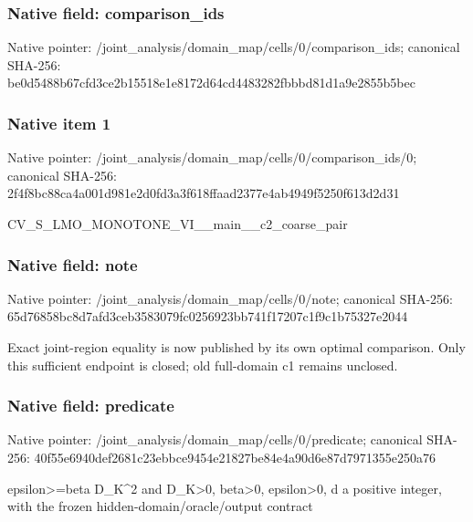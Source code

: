 \documentclass[10pt,a4paper]{article}
\begin{document}
\subsubsection{Native field: comparison\_\allowbreak{}ids}
Native pointer: /joint\_\allowbreak{}analysis/domain\_\allowbreak{}map/cells/0/comparison\_\allowbreak{}ids; canonical SHA-256: be0d5488b67cfd3ce2b15518e1e8172d64cd4483282fbbbd81d1a9e2855b5bec

\subsubsection{Native item 1}
Native pointer: /joint\_\allowbreak{}analysis/domain\_\allowbreak{}map/cells/0/comparison\_\allowbreak{}ids/0; canonical SHA-256: 2f4f8bc88ca4a001d981e2d0fd3a3f618ffaad2377e4ab4949f5250f613d2d31

\begingroup\raggedright\sloppy CV\_\allowbreak{}S\_\allowbreak{}LMO\_\allowbreak{}MONOTONE\_\allowbreak{}VI\_\allowbreak{}\_\allowbreak{}main\_\allowbreak{}\_\allowbreak{}c2\_\allowbreak{}coarse\_\allowbreak{}pair\par\endgroup

\subsubsection{Native field: note}
Native pointer: /joint\_\allowbreak{}analysis/domain\_\allowbreak{}map/cells/0/note; canonical SHA-256: 65d76858bc8d7afd3ceb3583079fc0256923bb741f17207c1f9c1b75327e2044

\begingroup\raggedright\sloppy Exact joint-region equality is now published by its own optimal comparison. Only this sufficient endpoint is closed;\allowbreak{} old full-domain c1 remains unclosed.\par\endgroup

\subsubsection{Native field: predicate}
Native pointer: /joint\_\allowbreak{}analysis/domain\_\allowbreak{}map/cells/0/predicate; canonical SHA-256: 40f55e6940def2681c23ebbce9454e21827be84e4a90d6e87d7971355e250a76

\begingroup\raggedright\sloppy epsilon>=\allowbreak{}beta D\_\allowbreak{}K\textasciicircum{}2 and D\_\allowbreak{}K>0,\allowbreak{} beta>0,\allowbreak{} epsilon>0,\allowbreak{} d a positive integer,\allowbreak{} with the frozen hidden-domain/\allowbreak{}oracle/\allowbreak{}output contract\par\endgroup
\end{document}
